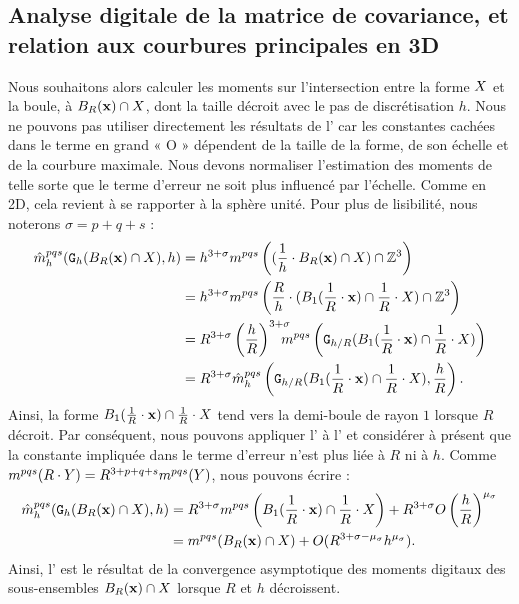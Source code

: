 \subsection{Analyse digitale de la matrice de covariance, et
relation aux courbures principales en 3D}
\label{sec:ii-3d}
%
Nous souhaitons alors calculer les moments sur l'intersection entre la forme
$X$ et la boule, \cad à $B_{R}(\mathbf{x}) \cap X$, dont la taille décroit
avec le pas de discrétisation $h$. Nous ne pouvons pas utiliser directement les résultats
de l' car les constantes cachées dans le
terme en grand « O » dépendent de la taille de la forme, de son échelle et de la
courbure maximale. Nous devons normaliser l'estimation des moments de telle sorte
que le terme d'erreur ne soit plus influencé par l'échelle. Comme en 2D, cela
revient à se rapporter à la sphère unité. Pour plus de lisibilité, nous noterons
$\sigma = p + q + s$ :
%
\begin{align} \label{eq:MomentsOnUnitaryBall}
%
  \DMom{pqs}{h}(\DigF{\Ball{R}{\vx} \cap \Shape}{h},h) &= h^{3+\sigma}\Mom{pqs}\left
  ( (\frac{1}{h} \cdot \Ball{R}{\vx} \cap \Shape) \cap \Z^3 \right) \nonumber \\
  &= h^{3+{\sigma}} \Mom{pqs}\left( \frac{R}{h}\cdot(
  \Ball{1}{\frac{1}{R} \cdot \vx} \cap \frac{1}{R} \cdot \Shape) \cap \Z^3 \right) \nonumber \\
  &= R^{3+{\sigma}} \left( \frac{h}{R} \right)^{3+{\sigma}} \hspace{-0.3cm} \Mom{pqs} \left( \DigF{ \Ball{1}{\frac{1}{R}\cdot \vx}\cap\frac{1}{R}\cdot \Shape}{h/R} \right) \nonumber\\
  &= R^{3+{\sigma}}\DMom{pqs}{h}\left( \DigF{ \Ball{1}{\frac{1}{R}\cdot \vx}\cap\frac{1}{R}\cdot \Shape}{h/R}, {\frac{h}{R}} \right).
%
\end{align}
%
Ainsi, la forme $B_{1}(\frac{1}{R} \cdot \mathbf{x})\cap\frac{1}{R}\cdot X$
tend vers la demi-boule de rayon $1$ lorsque $R$ décroit. Par conséquent, nous
pouvons appliquer l' à
l' et considérer à présent que la constante
impliquée dans le terme d'erreur n'est plus liée à $R$ ni à $h$. Comme $m^{pqs}(R \cdot Y) = R^{3+p+q+s} m^{pqs}(Y)$, nous
pouvons écrire :
%
\begin{align} \label{eq:MomentsOnUnitaryBall-conv}
%
  \DMom{pqs}{h}(\DigF{\Ball{R}{\vx} \cap \Shape}{h},h) &= R^{3+\sigma}
  \Mom{pqs}\left( \Ball{1}{\frac{1}{R}\cdot \vx} \cap \frac{1}{R}\cdot \Shape
  \right) + R^{3+\sigma} O \left( \frac{h}{R} \right)^{\mu_{{\sigma}}}  \nonumber \\
   &= \Mom{pqs}( \Ball{R}{\vx} \cap \Shape ) + O( R^{3+{\sigma}-\mu_\sigma} h^{\mu_\sigma}).
%
\end{align}
%
Ainsi, l' est le résultat de la
convergence asymptotique des moments digitaux des sous-ensembles $B_{R}(\mathbf{x})
\cap X$ lorsque $R$ et $h$ décroissent.
%
